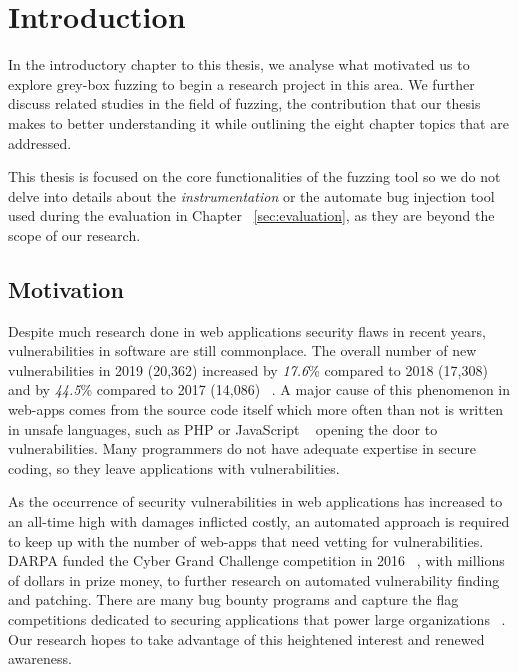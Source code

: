 \chapter{Introduction}
\minitoc
\vspace*{1cm}

In the introductory chapter to this thesis, we analyse what motivated us to explore grey-box fuzzing to begin a research project in this area. We further discuss related studies in the field of fuzzing, the contribution that our thesis makes to better understanding it while outlining the eight chapter topics that are addressed.

This thesis is focused on the core functionalities of the fuzzing tool so we do not delve into details about the \emph{instrumentation} or the automate bug injection tool used during the evaluation in Chapter ~\ref{sec:evaluation}, as they are beyond the scope of our research.

\section{Motivation}

Despite much research done in web applications security flaws in recent years, vulnerabilities in software are still commonplace. The overall number of new vulnerabilities in 2019 (20,362) increased by \emph{17.6}\% compared to 2018 (17,308) and by \emph{44.5}\% compared to 2017 (14,086) ~\cite{vulnerabilities2019state,owasp2017}. A major cause of this phenomenon in web-apps comes from the source code itself which more often than not is written in unsafe languages, such as PHP or JavaScript ~\cite{vulnerabilities2019state} opening the door to vulnerabilities. Many programmers do not have adequate expertise in secure coding, so they leave applications with vulnerabilities. 

As the occurrence of security vulnerabilities in web applications has increased to an all-time high with damages inflicted costly, an automated approach is required to keep up with the number of web-apps that need vetting for vulnerabilities. DARPA funded the Cyber Grand Challenge competition in 2016 ~\cite{darpa2016cgc}, with millions of dollars in prize money, to further research on automated vulnerability finding and patching. There are many bug bounty programs and capture the flag competitions dedicated to securing applications that power large organizations ~\cite{bugbounty}. Our research hopes to take advantage of this heightened interest and renewed awareness.

